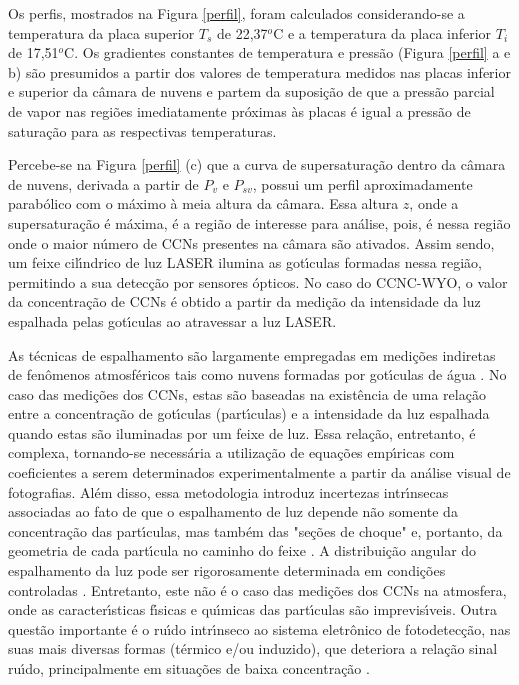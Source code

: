 Os perfis, mostrados na Figura \ref{perfil},  foram calculados considerando-se a temperatura da placa superior $T_s$ de 22,37$^o$C e a temperatura da placa inferior $T_i$ de 17,51$^o$C. Os gradientes constantes de temperatura e press\~{a}o (Figura \ref{perfil} a e b) s\~{a}o presumidos a partir dos valores de temperatura medidos nas placas inferior e superior da c\^{a}mara de nuvens e partem da suposi\c{c}\~{a}o de que a press\~{a}o parcial de vapor nas regi\~{o}es imediatamente pr\'{o}ximas \`{a}s placas \'{e} igual a press\~{a}o de satura\c{c}\~{a}o para as respectivas temperaturas.

Percebe-se na Figura \ref{perfil} (c) que a curva de supersatura\c{c}\~{a}o dentro da c\^{a}mara de nuvens, derivada a partir de $P_v$ e $P_{sv}$, possui um perfil aproximadamente parab\'{o}lico com o m\'{a}ximo \`{a} meia altura da c\^{a}mara. Essa altura $z$, onde a supersatura\c{c}\~{a}o \'{e} m\'{a}xima, \'{e} a regi\~{a}o de interesse para an\'{a}lise, pois, \'{e} nessa regi\~{a}o onde o maior n\'{u}mero de CCNs presentes na c\^{a}mara s\~{a}o ativados. Assim sendo, um feixe cil\'{\i}ndrico de luz LASER ilumina as got\'{\i}culas formadas nessa regi\~{a}o, permitindo a sua detec\c{c}\~{a}o por sensores \'{o}pticos. No caso do CCNC-WYO, o valor da concentra\c{c}\~{a}o de CCNs \'{e} obtido a partir da medi\c{c}\~{a}o da intensidade da luz espalhada pelas got\'{\i}culas ao atravessar a luz LASER.

As t\'{e}cnicas de espalhamento s\~{a}o largamente empregadas em medi\c{c}\~{o}es indiretas de fen\^{o}menos atmosf\'{e}ricos tais como nuvens formadas por got\'{\i}culas de \'{a}gua \cite{Frisvad}. No caso das medi\c{c}\~{o}es dos CCNs, estas s\~{a}o baseadas na exist\^{e}ncia de uma rela\c{c}\~{a}o entre a concentra\c{c}\~{a}o de got\'{\i}culas (part\'{\i}culas) e a intensidade da luz espalhada quando estas s\~{a}o iluminadas por um feixe de luz. Essa rela\c{c}\~{a}o, entretanto, \'{e}  complexa, tornando-se necess\'{a}ria a utiliza\c{c}\~{a}o de equa\c{c}\~{o}es emp\'{\i}ricas com coeficientes a serem determinados experimentalmente \cite{Oliveira} a partir da an\'{a}lise visual de fotografias. Al\'{e}m disso, essa metodologia introduz incertezas intr\'{\i}nsecas associadas ao fato de que o espalhamento de luz depende n\~{a}o somente da concentra\c{c}\~{a}o das part\'{\i}culas, mas tamb\'{e}m das "se\c{c}\~{o}es de choque" e, portanto, da geometria de cada part\'{\i}cula no caminho do feixe \cite{Oliveira}. A distribui\c{c}\~{a}o angular do espalhamento da luz pode ser rigorosamente determinada em condi\c{c}\~{o}es controladas \cite{McMurry}. Entretanto, este n\~{a}o \'{e} o caso das medi\c{c}\~{o}es dos CCNs na atmosfera, onde as caracter\'{\i}sticas f\'{\i}sicas e qu\'{\i}micas das part\'{\i}culas s\~{a}o imprevis\'{\i}veis. Outra quest\~{a}o importante \'{e} o ru\'{\i}do intr\'{\i}nseco  ao sistema eletr\^{o}nico de fotodetec\c{c}\~{a}o, nas suas mais diversas formas (t\'{e}rmico e/ou induzido),  que deteriora a rela\c{c}\~{a}o sinal ru\'{\i}do, principalmente em situa\c{c}\~{o}es de baixa concentra\c{c}\~{a}o \cite{Pinheiro}.


